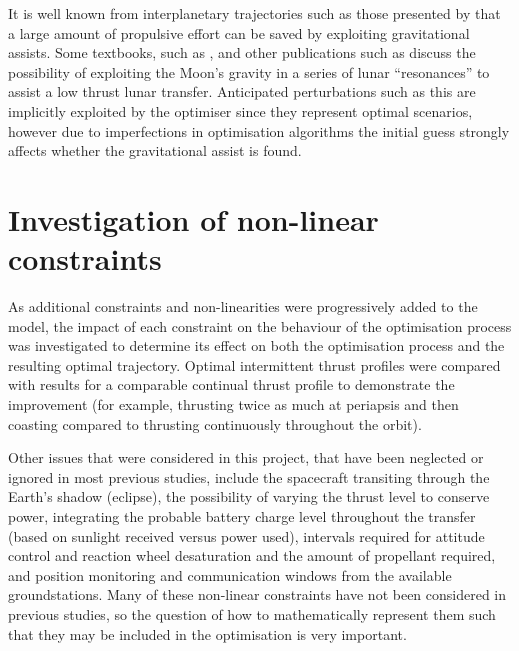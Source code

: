 
It is well known from interplanetary trajectories such as those presented by \textcite{Petukhov2007} that a large amount of propulsive effort can be saved by exploiting gravitational assists. Some textbooks, such as \textcite{Kemble2006}, and other publications such as \textcite{Letterio_thesis} discuss the possibility of exploiting the Moon's gravity in a series of lunar \enquote{resonances} to assist a low thrust lunar transfer. Anticipated perturbations such as this are implicitly exploited by the optimiser since they represent optimal scenarios, however due to imperfections in optimisation algorithms the initial guess strongly affects whether the gravitational assist is found.

\section{Investigation of non-linear constraints} \label{sec:Constraint-objective}

As additional constraints and non-linearities were progressively added to the model, the impact of each constraint on the behaviour of the optimisation process was investigated to determine its effect on both the optimisation process and the resulting optimal trajectory. Optimal intermittent thrust profiles were compared with results for a comparable continual thrust profile to demonstrate the improvement (for example, thrusting twice as much at periapsis and then coasting compared to thrusting continuously throughout the orbit). 

Other issues that were considered in this project, that have been neglected or ignored in most previous studies, include the spacecraft transiting through the Earth's shadow (eclipse), the possibility of varying the thrust level to conserve power, integrating the probable battery charge level throughout the transfer (based on sunlight received versus power used), intervals required for attitude control and reaction wheel desaturation and the amount of propellant required, and position monitoring and communication windows from the available groundstations. Many of these non-linear constraints have not been considered in previous studies, so the question of how to mathematically represent them such that they may be included in the optimisation is very important.


